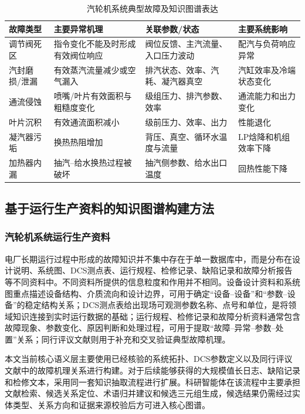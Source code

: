 \begin{table}[htbp]
    \centering
    \caption{汽轮机系统典型故障及知识图谱表达}
    \label{tab:turbine_fault_knowledge_v3}
    \begin{tabular}{p{}p{}p{}p{}}
        \toprule
        故障类型 & 主要异常机理 & 关联参数/状态 & 主要系统影响 \\
        \midrule
        调节阀死区 & 指令变化不能及时形成有效阀位响应 & 阀位反馈、主汽流量、入口压力波动 & 配汽与负荷响应异常 \\
        汽封磨损/泄漏 & 有效蒸汽流量减少或空气漏入 & 排汽状态、效率、汽耗、凝汽器真空 & 汽缸效率及冷端状态变化 \\
        通流侵蚀 & 喷嘴/叶片有效面积与粗糙度变化 & 级组压力、排汽参数、效率 & 通流能力和出力变化 \\
        叶片沉积 & 有效通流面积减小 & 级前压力、效率、出力 & 性能退化 \\
        凝汽器污垢 & 换热热阻增加 & 背压、真空、循环水温度与流量 & LP焓降和机组效率下降 \\
        加热器内漏 & 抽汽--给水换热过程被破坏 & 抽汽侧参数、给水出口温度 & 回热性能下降 \\
        \bottomrule
    \end{tabular}
\end{table}

\subsection{基于运行生产资料的知识图谱构建方法}
\label{subsec:kg_construction_v3}

\subsubsection{汽轮机系统运行生产资料}

电厂长期运行过程中形成的故障知识并不集中存在于单一数据库中，而是分布在设计说明、系统图、DCS测点表、运行规程、检修记录、缺陷记录和故障分析报告等不同资料中。不同资料所提供的信息粒度和作用并不相同。设备设计资料和系统图重点描述设备结构、介质流向和设计边界，可用于确定“设备--设备”和“参数--设备”的稳定结构关系；DCS测点表给出现场可观测参数名称、点号和单位，是将领域知识连接到实时运行数据的基础；运行规程、检修记录和故障分析资料通常包含故障现象、参数变化、原因判断和处理过程，可用于提取“故障--异常--参数--处置”关系；同行评议文献则用于补充和交叉验证典型故障机理。

本文当前核心语义层主要使用已经核验的系统拓扑、DCS参数定义以及同行评议文献中的故障机理关系进行构建。对于后续能够获得的大规模值长日志、缺陷记录和检修文本，采用同一套知识抽取流程进行扩展。科研智能体在该流程中主要承担文献检索、候选关系定位、术语归并建议和候选三元组生成，候选结果仍需经过实体类型、关系方向和证据来源校验后方可进入核心图谱。

